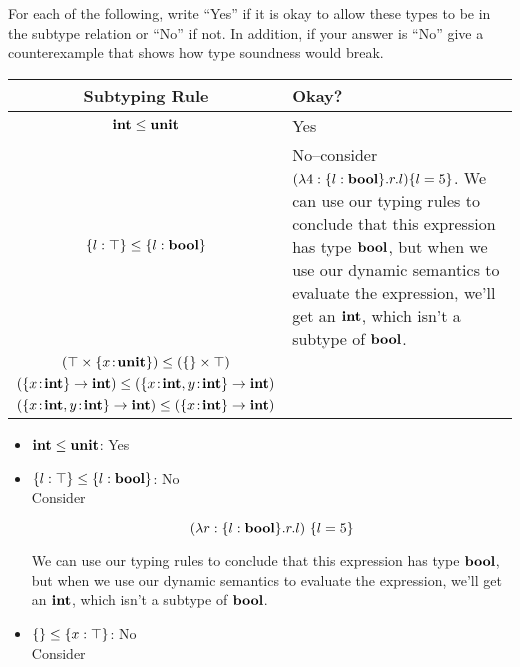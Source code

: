 \documentclass[10pt]{article}
\begin{document}
\begin{exercise}
  For each of the following, write ``Yes'' if it is okay to allow
  these types to be in the subtype relation or ``No'' if not. In
  addition, if your answer is ``No'' give a counterexample that shows
  how type soundness would break.

\begin{center}
\begin{tabular}{c|l}
	Subtyping Rule & Okay? \\
	\hline 
	$\mathsf{\textbf{int}} \leq \mathsf{\textbf{unit}}$ & Yes \\
	
	$\{ l : \top \} \leq \{ l : \mathsf{\textbf{bool}} \}$ & No--consider $(\lambda 4:\{l:
	\mathsf{\textbf{bool}}\}.r.l) \{l = 5\}$. We can use our typing rules to conclude that this
	expression has type $\mathsf{\textbf{bool}}$, but when we use our dynamic semantics to 
	evaluate the expression, we'll get an $\mathsf{\textbf{int}}$, which isn't a subtype of 
	$\mathsf{\textbf{bool}}$.\\ 
	
	$(\top \times \{ x \!:\! \mathsf{\textbf{unit}} \}) \leq (\{\} \times \top)$ & \\
	
	$(\{ x \!:\! \mathsf{\textbf{int}} \} \rightarrow \mathsf{\textbf{int}}) \leq (\{ x \!:\! \mathsf{\textbf{int}}, y \!:\!
	\mathsf{\textbf{int}} \} \rightarrow \mathsf{\textbf{int}})$ & \\
	
	$(\{ x \!:\! \mathsf{\textbf{int}}, y \!:\! \mathsf{\textbf{int}} \} \rightarrow \mathsf{\textbf{int}}) \leq (\{ x \!:\!
	\mathsf{\textbf{int}} \} \rightarrow \mathsf{\textbf{int}})$
	
\end{tabular}
\end{center}

\begin{itemize}
\item $\mathsf{\textbf{int}} \leq \mathsf{\textbf{unit}}$: 
			Yes \\
\item $\{ l : \top \} \leq \{ l : \mathsf{\textbf{bool}} \}$: 
			No \\
			Consider 
			
			$$(\lambda r:\{l:\mathsf{\textbf{bool}}\}.r.l) \text{ } \{l = 5\}$$ 
			
			We can use our typing rules to conclude that this
			expression has type $\mathsf{\textbf{bool}}$, but when we use our dynamic semantics to 
			evaluate the expression, we'll get an $\mathsf{\textbf{int}}$, which isn't a subtype of 
			$\mathsf{\textbf{bool}}$.\\ 

\item $\{ \} \leq \{ x : \top \}$: 
			No \\
			Consider 
			

\end{itemize}
\end{exercise}
\end{document}
